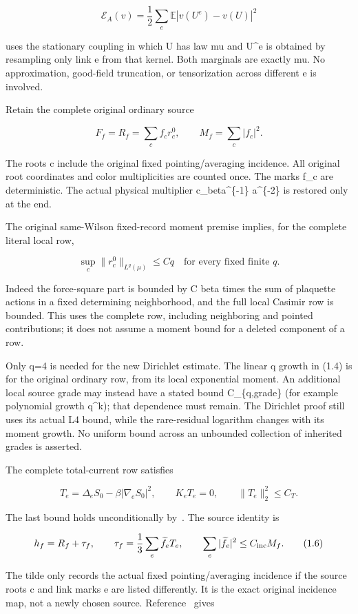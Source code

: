 \documentclass[
  11pt,
]{article}
\begin{document}
\[
 \mathcal E_A(v)=\frac12\sum_e
       \mathbb E|v(U^e)-v(U)|^2
 \tag{1.2}
\]

uses the stationary coupling in which U has law mu and U\^{}e is
obtained by resampling only link e from that kernel. Both marginals are
exactly mu. No approximation, good-field truncation, or tensorization
across different e is involved.

Retain the complete original ordinary source

\[
 F_f=R_f=\sum_c f_c r_c^0,
 \qquad M_f=\sum_c |f_c|^2.
 \tag{1.3}
\]

The roots c include the original fixed pointing/averaging incidence. All
original root coordinates and color multiplicities are counted once. The
marks f\_c are deterministic. The actual physical multiplier
c\_beta\^{}\{-1\} a\^{}\{-2\} is restored only at the end.

The original same-Wilson fixed-record moment premise implies, for the
complete literal local row,

\[
 \sup_c\|r_c^0\|_{L^q(\mu)}\le C q
 \quad\text{for every fixed finite }q.
 \tag{1.4}
\]

Indeed the force-square part is bounded by C beta times the sum of
plaquette actions in a fixed determining neighborhood, and the full
local Casimir row is bounded. This uses the complete row, including
neighboring and pointed contributions; it does not assume a moment bound
for a deleted component of a row.

Only q=4 is needed for the new Dirichlet estimate. The linear q growth
in (1.4) is for the original ordinary row, from its local exponential
moment. An additional local source grade may instead have a stated bound
C\_\{q,grade\} (for example polynomial growth q\^{}k); that dependence
must remain. The Dirichlet proof still uses its actual L4 bound, while
the rare-residual logarithm changes with its moment growth. No uniform
bound across an unbounded collection of inherited grades is asserted.

The complete total-current row satisfies

\[
 T_e=\Delta_eS_0-\beta|\nabla_eS_0|^2,
 \qquad K_eT_e=0,
 \qquad \|T_e\|_2^2\le C_T.
 \tag{1.5}
\]

The last bound holds unconditionally by~\cite{CT}. The source identity is

\[
 h_f=R_f+\tau_f,\qquad
 \tau_f=\frac13\sum_e\widetilde f_e T_e,
 \qquad\sum_e|\widetilde f_e|^2\le C_{\rm inc}M_f.
 \tag{1.6}
\]

The tilde only records the actual fixed pointing/averaging incidence if
the source roots c and link marks e are listed differently. It is the
exact original incidence map, not a newly chosen source. Reference~\cite{CT} gives
\end{document}
